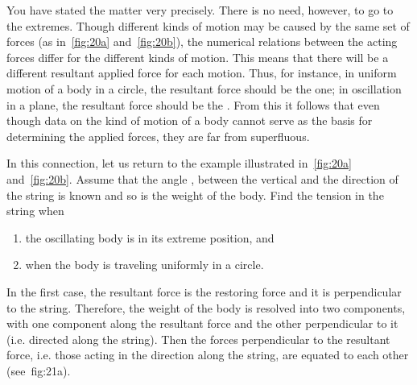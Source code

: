 \begin{p}
You have stated the matter very precisely. There is no need, however, to go to the extremes. Though different kinds of motion may be caused by the same set of forces (as in~\cref{fig:20a} and~\cref{fig:20b}), the numerical relations between the acting forces differ for the different kinds of motion. This means that there will be a different resultant applied force for each motion. Thus, for instance, in uniform motion of a body in a circle, the resultant force should be the  one; in oscillation in a plane, the resultant force should be the . From this it follows that even though data on the kind of motion of a body cannot serve as the basis for determining the applied forces, they are far from superfluous.

In this connection, let us return to the example illustrated in~\cref{fig:20a} and~\cref{fig:20b}. Assume that the angle \hlm{$\alpha$}, between the vertical and the direction of the string is known and so is the weight  of the body. Find the tension  in the string when 
\begin{enumerate}[label=(\arabic*)]
\item  the oscillating body is in its extreme position, and
\item when the body is traveling uniformly in a circle.
\end{enumerate}

In the first case, the resultant force is the restoring force and it is perpendicular to the string. Therefore, the weight  of the body is resolved into two components, with one component along the resultant force and the other perpendicular to it (i.e. directed along the string). Then the forces perpendicular to the resultant force, i.e. those acting in the direction along the string, are equated to each other (see~{fig:21a}). 

\begin{figure}[H]
\centering
\begin{tikzpicture}


\end{tikzpicture}
\end{figure}
\end{p}
